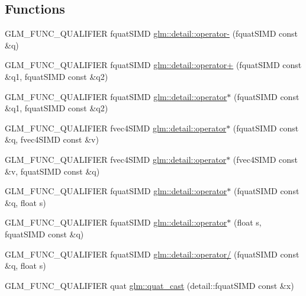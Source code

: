 \subsection*{Functions}
\begin{DoxyCompactItemize}
\item 
G\+L\+M\+\_\+\+F\+U\+N\+C\+\_\+\+Q\+U\+A\+L\+I\+F\+I\+E\+R fquat\+S\+I\+M\+D \hyperlink{namespaceglm_1_1detail_a07dbb5e436fcb64a3c165a15c920a484}{glm\+::detail\+::operator-\/} (fquat\+S\+I\+M\+D const \&q)
\item 
G\+L\+M\+\_\+\+F\+U\+N\+C\+\_\+\+Q\+U\+A\+L\+I\+F\+I\+E\+R fquat\+S\+I\+M\+D \hyperlink{namespaceglm_1_1detail_a0010f5683721f2724e0e00709fc51405}{glm\+::detail\+::operator+} (fquat\+S\+I\+M\+D const \&q1, fquat\+S\+I\+M\+D const \&q2)
\item 
G\+L\+M\+\_\+\+F\+U\+N\+C\+\_\+\+Q\+U\+A\+L\+I\+F\+I\+E\+R fquat\+S\+I\+M\+D \hyperlink{namespaceglm_1_1detail_a6e7c8ca42117ec6c0c60b765f083557b}{glm\+::detail\+::operator$\ast$} (fquat\+S\+I\+M\+D const \&q1, fquat\+S\+I\+M\+D const \&q2)
\item 
G\+L\+M\+\_\+\+F\+U\+N\+C\+\_\+\+Q\+U\+A\+L\+I\+F\+I\+E\+R fvec4\+S\+I\+M\+D \hyperlink{namespaceglm_1_1detail_af198c6bb57f5b38b3fd5961b8d9b352e}{glm\+::detail\+::operator$\ast$} (fquat\+S\+I\+M\+D const \&q, fvec4\+S\+I\+M\+D const \&v)
\item 
G\+L\+M\+\_\+\+F\+U\+N\+C\+\_\+\+Q\+U\+A\+L\+I\+F\+I\+E\+R fvec4\+S\+I\+M\+D \hyperlink{namespaceglm_1_1detail_a8da00ab5a90294ba3a8c7ebcb20a8bed}{glm\+::detail\+::operator$\ast$} (fvec4\+S\+I\+M\+D const \&v, fquat\+S\+I\+M\+D const \&q)
\item 
G\+L\+M\+\_\+\+F\+U\+N\+C\+\_\+\+Q\+U\+A\+L\+I\+F\+I\+E\+R fquat\+S\+I\+M\+D \hyperlink{namespaceglm_1_1detail_a828cc0ad293110da78ec58305e89ac3a}{glm\+::detail\+::operator$\ast$} (fquat\+S\+I\+M\+D const \&q, float s)
\item 
G\+L\+M\+\_\+\+F\+U\+N\+C\+\_\+\+Q\+U\+A\+L\+I\+F\+I\+E\+R fquat\+S\+I\+M\+D \hyperlink{namespaceglm_1_1detail_a586bbba0bf2940cecf9565510005679a}{glm\+::detail\+::operator$\ast$} (float s, fquat\+S\+I\+M\+D const \&q)
\item 
G\+L\+M\+\_\+\+F\+U\+N\+C\+\_\+\+Q\+U\+A\+L\+I\+F\+I\+E\+R fquat\+S\+I\+M\+D \hyperlink{namespaceglm_1_1detail_a242a463e8c91e55fd54ad6a68016e839}{glm\+::detail\+::operator/} (fquat\+S\+I\+M\+D const \&q, float s)
\item 
G\+L\+M\+\_\+\+F\+U\+N\+C\+\_\+\+Q\+U\+A\+L\+I\+F\+I\+E\+R quat \hyperlink{namespaceglm_a68af15a87ea3aac558767c9bb2ed141d}{glm\+::quat\+\_\+cast} (detail\+::fquat\+S\+I\+M\+D const \&x)

\end{DoxyCompactItemize}
